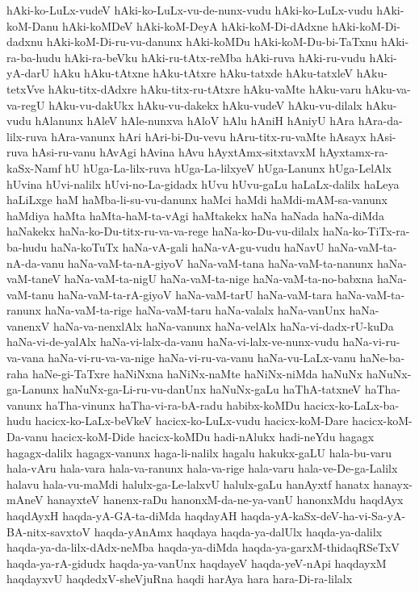 {hAki-ko-LuLx-vudeV
hAki-ko-LuLx-vu-de-nunx-vudu
hAki-ko-LuLx-vudu
hAki-koM-Danu
hAki-koMDeV
hAki-koM-DeyA
hAki-koM-Di-dAdxne
hAki-koM-Di-dadxnu
hAki-koM-Di-ru-vu-danunx
hAki-koMDu
hAki-koM-Du-bi-TaTxnu
hAki-ra-ba-hudu
hAki-ra-beVku
hAki-ru-tAtx-reMba
hAki-ruva
hAki-ru-vudu
hAki-yA-darU
hAku
hAku-tAtxne
hAku-tAtxre
hAku-tatxde
hAku-tatxleV
hAku-tetxVve
hAku-titx-dAdxre
hAku-titx-ru-tAtxre
hAku-vaMte
hAku-varu
hAku-va-va-regU
hAku-vu-dakUkx
hAku-vu-dakekx
hAku-vudeV
hAku-vu-dilalx
hAku-vudu
hAlanunx
hAleV
hAle-nunxva
hAloV
hAlu
hAniH
hAniyU
hAra
hAra-da-lilx-ruva
hAra-vanunx
hAri
hAri-bi-Du-vevu
hAru-titx-ru-vaMte
hAsayx
hAsi-ruva
hAsi-ru-vanu
hAvAgi
hAvina
hAvu
hAyxtAmx-sitxtavxM
hAyxtamx-ra-kaSx-Namf
hU
hUga-La-lilx-ruva
hUga-La-lilxyeV
hUga-Lanunx
hUga-LelAlx
hUvina
hUvi-nalilx
hUvi-no-La-gidadx
hUvu
hUvu-gaLu
haLaLx-dalilx
haLeya
haLiLxge
haM
haMba-li-su-vu-danunx
haMci
haMdi
haMdi-mAM-sa-vanunx
haMdiya
haMta
haMta-haM-ta-vAgi
haMtakekx
haNa
haNada
haNa-diMda
haNakekx
haNa-ko-Du-titx-ru-va-va-rege
haNa-ko-Du-vu-dilalx
haNa-ko-TiTx-ra-ba-hudu
haNa-koTuTx
haNa-vA-gali
haNa-vA-gu-vudu
haNavU
haNa-vaM-ta-nA-da-vanu
haNa-vaM-ta-nA-giyoV
haNa-vaM-tana
haNa-vaM-ta-nanunx
haNa-vaM-taneV
haNa-vaM-ta-nigU
haNa-vaM-ta-nige
haNa-vaM-ta-no-babxna
haNa-vaM-tanu
haNa-vaM-ta-rA-giyoV
haNa-vaM-tarU
haNa-vaM-tara
haNa-vaM-ta-ranunx
haNa-vaM-ta-rige
haNa-vaM-taru
haNa-valalx
haNa-vanUnx
haNa-vanenxV
haNa-va-nenxlAlx
haNa-vanunx
haNa-velAlx
haNa-vi-dadx-rU-kuDa
haNa-vi-de-yalAlx
haNa-vi-lalx-da-vanu
haNa-vi-lalx-ve-nunx-vudu
haNa-vi-ru-va-vana
haNa-vi-ru-va-va-nige
haNa-vi-ru-va-vanu
haNa-vu-LaLx-vanu
haNe-ba-raha
haNe-gi-TaTxre
haNiNxna
haNiNx-naMte
haNiNx-niMda
haNuNx
haNuNx-ga-Lanunx
haNuNx-ga-Li-ru-vu-danUnx
haNuNx-gaLu
haThA-tatxneV
haTha-vanunx
haTha-vinunx
haTha-vi-ra-bA-radu
habibx-koMDu
hacicx-ko-LaLx-ba-hudu
hacicx-ko-LaLx-beVkeV
hacicx-ko-LuLx-vudu
hacicx-koM-Dare
hacicx-koM-Da-vanu
hacicx-koM-Dide
hacicx-koMDu
hadi-nAlukx
hadi-neYdu
hagagx
hagagx-dalilx
hagagx-vanunx
haga-li-nalilx
hagalu
hakukx-gaLU
hala-bu-varu
hala-vAru
hala-vara
hala-va-ranunx
hala-va-rige
hala-varu
hala-ve-De-ga-Lalilx
halavu
hala-vu-maMdi
halulx-ga-Le-lalxvU
halulx-gaLu
hanAyxtf
hanatx
hanayx-mAneV
hanayxteV
hanenx-raDu
hanonxM-da-ne-ya-vanU
hanonxMdu
haqdAyx
haqdAyxH
haqda-yA-GA-ta-diMda
haqdayAH
haqda-yA-kaSx-deV-ha-vi-Sa-yA-BA-nitx-savxtoV
haqda-yAnAmx
haqdaya
haqda-ya-dalUlx
haqda-ya-dalilx
haqda-ya-da-lilx-dAdx-neMba
haqda-ya-diMda
haqda-ya-garxM-thidaqRSeTxV
haqda-ya-rA-gidudx
haqda-ya-vanUnx
haqdayeV
haqda-yeV-nApi
haqdayxM
haqdayxvU
haqdedxV-sheVjuRna
haqdi
harAya
hara
hara-Di-ra-lilalx
}

